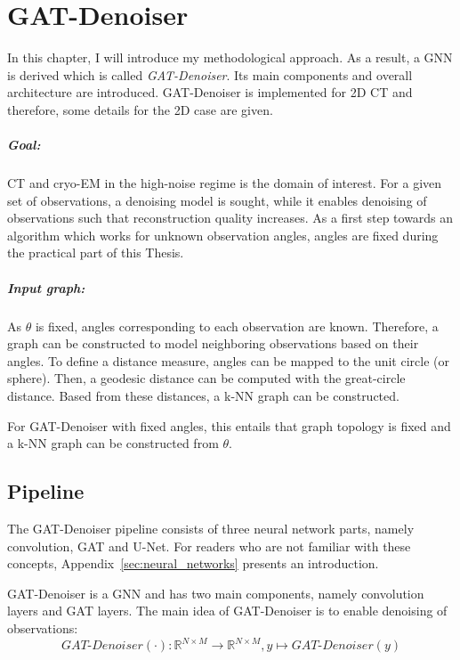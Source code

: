 \chapter{GAT-Denoiser}
\label{sec:contribution}

In this chapter, I will introduce my methodological approach.
As a result, a GNN is derived which is called \textit{GAT-Denoiser}.
Its main components and overall architecture are introduced.
GAT-Denoiser is implemented for 2D CT and therefore, some details for the 2D case are given.


\paragraph{Goal:}
CT and cryo-EM in the high-noise regime is the domain of interest.
For a given set of observations, a denoising model is sought, while
it enables denoising of observations such that reconstruction quality increases.
As a first step towards an algorithm which works for unknown observation angles, 
angles are fixed during the practical part of this Thesis.


\paragraph{Input graph:}
As $\theta$ is fixed, angles corresponding to each observation are known.
Therefore, a graph can be constructed to model neighboring observations 
based on their angles.
To define a distance measure, angles can be mapped to the unit circle (or sphere).
Then, a geodesic distance can be computed with the great-circle distance.
Based from these distances, a k-NN graph can be constructed.


\begin{tcolorbox}[colback=red!5!white,colframe=red!75!black]
  For GAT-Denoiser with fixed angles, this entails that graph topology is fixed and
  a k-NN graph can be constructed from $\theta$.
\end{tcolorbox}

\section{Pipeline}
\label{sec:concept}
The GAT-Denoiser pipeline consists of three neural network parts, namely convolution, GAT and U-Net.
For readers who are not familiar with these concepts, Appendix~\ref{sec:neural_networks} presents an introduction.

GAT-Denoiser is a GNN and has two main components, namely convolution layers and GAT layers.
The main idea of GAT-Denoiser is to enable denoising of observations:
\begin{equation}
  \textit{GAT-Denoiser} (\cdot) : \mathbb{R}^{N \times M} \to  \mathbb{R}^{N \times M} , y \mapsto \textit{GAT-Denoiser} (y) 
\end{equation}

